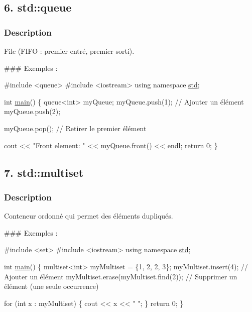 \subsection*{6. std\+::queue}

\subsubsection*{Description}

File (F\+I\+FO \+: premier entré, premier sorti).

\#\#\# Exemples \+: 
\begin{DoxyCode}
\textcolor{preprocessor}{#include <queue>}
\textcolor{preprocessor}{#include <iostream>}
\textcolor{keyword}{using namespace }\hyperlink{namespacestd}{std};

\textcolor{keywordtype}{int} \hyperlink{htop_8c_a3c04138a5bfe5d72780bb7e82a18e627}{main}() \{
    queue<int> myQueue;
    myQueue.push(1); \textcolor{comment}{// Ajouter un élément}
    myQueue.push(2);

    myQueue.pop(); \textcolor{comment}{// Retirer le premier élément}

    cout << \textcolor{stringliteral}{"Front element: "} << myQueue.front() << endl;
    \textcolor{keywordflow}{return} 0;
\}
\end{DoxyCode}




\subsection*{7. std\+::multiset}

\subsubsection*{Description}

Conteneur ordonné qui permet des éléments dupliqués.

\#\#\# Exemples \+: 
\begin{DoxyCode}
\textcolor{preprocessor}{#include <set>}
\textcolor{preprocessor}{#include <iostream>}
\textcolor{keyword}{using namespace }\hyperlink{namespacestd}{std};

\textcolor{keywordtype}{int} \hyperlink{htop_8c_a3c04138a5bfe5d72780bb7e82a18e627}{main}() \{
    multiset<int> myMultiset = \{1, 2, 2, 3\};
    myMultiset.insert(4); \textcolor{comment}{// Ajouter un élément}
    myMultiset.erase(myMultiset.find(2)); \textcolor{comment}{// Supprimer un élément (une seule occurrence)}

    \textcolor{keywordflow}{for} (\textcolor{keywordtype}{int} x : myMultiset) \{
        cout << x << \textcolor{stringliteral}{" "};
    \}
    \textcolor{keywordflow}{return} 0;
\}
\end{DoxyCode}




